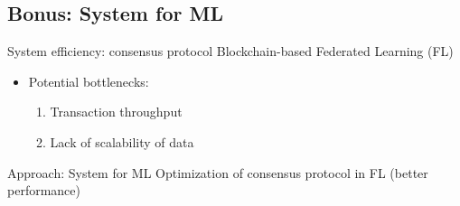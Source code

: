 
\subsection{Bonus: System for ML}

\begin{frame}{System efficiency: consensus protocol}
\alert{Blockchain-based Federated Learning (FL)}
  \begin{itemize}
    \item Potential bottlenecks:
    	\begin{enumerate}
            \item Transaction throughput
            \item Lack of scalability of data
          \end{enumerate}
    \end{itemize}

  \begin{block}{Approach: System for ML}
  	Optimization of consensus protocol in FL (better performance)
  \end{block}
\end{frame}

